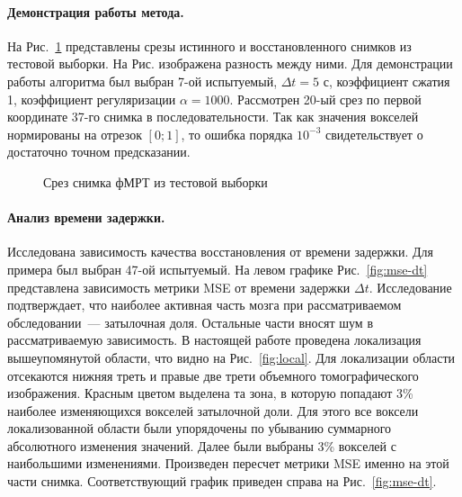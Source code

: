 \documentclass[a4paper, 12pt]{extarticle}
\begin{document}
\paragraph*{Демонстрация работы метода.}

На Рис.~\ref*{fig:example} представлены срезы истинного и восстановленного снимков из
тестовой выборки. На Рис. изображена разность между ними.
Для демонстрации работы алгоритма был выбран 7-ой испытуемый, $\Delta t = 5 \text{ с}$, коэффициент сжатия 1, коэффициент регуляризации
$\alpha = 1000$. Рассмотрен 20-ый срез по первой координате 37-го снимка в последовательности.
Так как значения вокселей нормированы на отрезок $[0; 1]$, то ошибка порядка $10^{-3}$
свидетельствует о достаточно точном предсказании.

\begin{figure}[h!]
	\centering
	\hfill
	\hfill
	\caption{Срез снимка фМРТ из тестовой выборки}
	\label{fig:example}
\end{figure}

\paragraph*{Анализ времени задержки.}

Исследована зависимость качества восстановления от времени задержки.
Для примера был выбран 47-ой испытуемый.
На левом графике Рис.~\ref{fig:mse-dt} представлена зависимость метрики MSE
от времени задержки $\Delta t$.
Исследование \citep{anderson2006} подтверждает, что наиболее активная часть мозга
при рассматриваемом обследовании~--- затылочная доля.
Остальные части вносят шум в рассматриваемую зависимость.
В настоящей работе проведена локализация вышеупомянутой области, 
что видно на Рис.~\ref{fig:local}.
Для локализации области отсекаются нижняя треть и правые две трети объемного
томографического изображения.
Красным цветом выделена та зона, в которую попадают 3\% наиболее 
изменяющихся вокселей затылочной доли.
Для этого все воксели локализованной области были упорядочены по 
убыванию суммарного абсолютного изменения значений.
Далее были выбраны 3\% вокселей с наибольшими изменениями.
Произведен пересчет метрики MSE именно на этой части снимка.
Соответствующий график приведен справа на Рис.~\ref{fig:mse-dt}.
\end{document}
